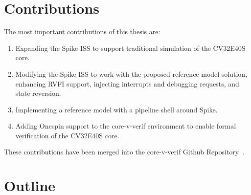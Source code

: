 

\section{Contributions}

The most important contributions of this thesis are:

\begin{enumerate}
    \item Expanding the Spike ISS to support traditional simulation of the CV32E40S core.
    \item Modifying the Spike ISS to work with the proposed reference model solution, enhancing RVFI support, injecting interrupts and debugging requests, and state reversion.
    \item Implementing a reference model with a pipeline shell around Spike.
    \item Adding Onespin support to the core-v-verif environment to enable formal verification of the CV32E40S core.
\end{enumerate}

These contributions have been merged into the core-v-verif Github Repository~\cite{openhwgroupOpenhwgroupCorevverif2023}.


\section{Outline}



